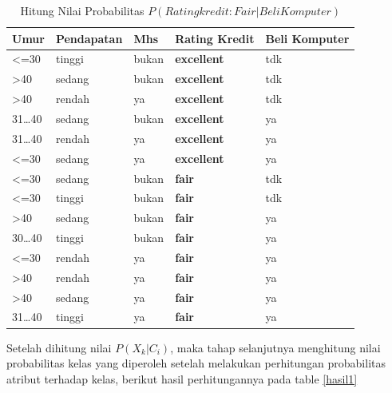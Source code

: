 \begin{enumerate}
\begin{table}[!ht]
\centering
\caption{Hitung Nilai Probabilitas $P(Ratingkredit:Fair|Beli Komputer)$}
\label{prob2}
\begin{tabular}{|l|l|l|l|l|}
\hline
Umur             & Pendapatan & Mhs   & \textbf{Rating Kredit} & Beli Komputer \\ \hline
\textless{}=30   & tinggi     & bukan & \textbf{excellent}     & tdk           \\ \hline
\textgreater{}40 & sedang     & bukan & \textbf{excellent}     & tdk           \\ \hline
\textgreater{}40 & rendah     & ya    & \textbf{excellent}     & tdk           \\ \hline
31…40            & sedang     & bukan & \textbf{excellent}     & ya            \\ \hline
31…40            & rendah     & ya    & \textbf{excellent}     & ya            \\ \hline
\textless{}=30   & sedang     & ya    & \textbf{excellent}     & ya            \\ \hline
\textless{}=30   & sedang     & bukan & \textbf{fair}          & tdk           \\ \hline
\textless{}=30   & tinggi     & bukan & \textbf{fair}          & tdk           \\ \hline
\textgreater{}40 & sedang     & bukan & \textbf{fair}          & ya            \\ \hline
30…40            & tinggi     & bukan & \textbf{fair}          & ya            \\ \hline
\textless{}=30   & rendah     & ya    & \textbf{fair}          & ya            \\ \hline
\textgreater{}40 & rendah     & ya    & \textbf{fair}          & ya            \\ \hline
\textgreater{}40 & sedang     & ya    & \textbf{fair}          & ya            \\ \hline
31…40            & tinggi     & ya    & \textbf{fair}          & ya            \\ \hline
\end{tabular}
\end{table}
\pagebreak
\pagebreak
\par Setelah dihitung nilai  $P(X_{k}|C_{i})$, maka tahap selanjutnya menghitung nilai probabilitas kelas yang diperoleh setelah melakukan perhitungan probabilitas atribut terhadap kelas, berikut hasil perhitungannya pada table \ref{hasil1}
\begin{table}[!ht]

\end{table}
\end{enumerate}
